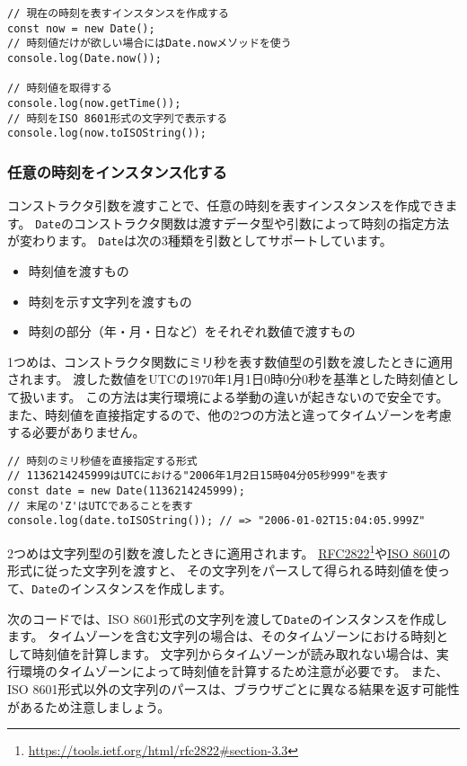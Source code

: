 \begin{lstlisting}
// 現在の時刻を表すインスタンスを作成する
const now = new Date();
// 時刻値だけが欲しい場合にはDate.nowメソッドを使う
console.log(Date.now());

// 時刻値を取得する
console.log(now.getTime());
// 時刻をISO 8601形式の文字列で表示する
console.log(now.toISOString());
\end{lstlisting}

\hypertarget{instance-any-time}{%
\subsubsection{任意の時刻をインスタンス化する}\label{instance-any-time}}

コンストラクタ引数を渡すことで、任意の時刻を表すインスタンスを作成できます。
\texttt{Date}のコンストラクタ関数は渡すデータ型や引数によって時刻の指定方法が変わります。
\texttt{Date}は次の3種類を引数としてサポートしています。

\begin{itemize}
\item
  時刻値を渡すもの
\item
  時刻を示す文字列を渡すもの
\item
  時刻の部分（年・月・日など）をそれぞれ数値で渡すもの
\end{itemize}

1つめは、コンストラクタ関数にミリ秒を表す数値型の引数を渡したときに適用されます。
渡した数値をUTCの1970年1月1日0時0分0秒を基準とした時刻値として扱います。
この方法は実行環境による挙動の違いが起きないので安全です。
また、時刻値を直接指定するので、他の2つの方法と違ってタイムゾーンを考慮する必要がありません。

\begin{lstlisting}
// 時刻のミリ秒値を直接指定する形式
// 1136214245999はUTCにおける"2006年1月2日15時04分05秒999"を表す
const date = new Date(1136214245999);
// 末尾の'Z'はUTCであることを表す
console.log(date.toISOString()); // => "2006-01-02T15:04:05.999Z"
\end{lstlisting}

2つめは文字列型の引数を渡したときに適用されます。
\href{https://tools.ietf.org/html/rfc2822\#section-3.3}{RFC2822}\footnote{\url{https://tools.ietf.org/html/rfc2822\#section-3.3}}や\href{https://ja.wikipedia.org/wiki/ISO_8601}{ISO
8601}の形式に従った文字列を渡すと、
その文字列をパースして得られる時刻値を使って、\texttt{Date}のインスタンスを作成します。

次のコードでは、ISO
8601形式の文字列を渡して\texttt{Date}のインスタンスを作成します。
タイムゾーンを含む文字列の場合は、そのタイムゾーンにおける時刻として時刻値を計算します。
文字列からタイムゾーンが読み取れない場合は、実行環境のタイムゾーンによって時刻値を計算するため注意が必要です。
また、ISO
8601形式以外の文字列のパースは、ブラウザごとに異なる結果を返す可能性があるため注意しましょう。

